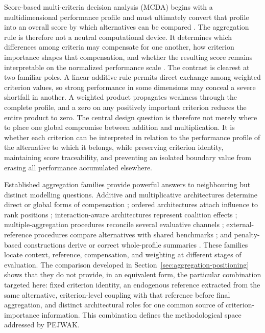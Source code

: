 \documentclass[reqno,11pt]{amsart}
\theoremstyle{definition}
\theoremstyle{plain}
\theoremstyle{remark}
\begin{document}
Score-based multi-criteria decision analysis (MCDA) begins with a
multidimensional performance profile and must ultimately convert that
profile into an overall score by which alternatives can be compared
\cite{Greco2025,Keeney1976}. The aggregation rule is therefore not a
neutral computational device. It determines which differences among
criteria may compensate for one another, how criterion importance shapes
that compensation, and whether the resulting score remains interpretable
on the normalized performance scale
\cite{Bouyssou1986,Beliakov2007}. The contrast is clearest at two familiar
poles. A linear additive rule permits direct exchange among weighted
criterion values, so strong performance in some dimensions may conceal a
severe shortfall in another. A weighted product propagates weakness
through the complete profile, and a zero on any positively important
criterion reduces the entire product to zero. The central design question
is therefore not merely where to place one global compromise between
addition and multiplication. It is whether each criterion can be
interpreted in relation to the performance profile of the alternative to
which it belongs, while preserving criterion identity, maintaining score
traceability, and preventing an isolated boundary value from erasing all
performance accumulated elsewhere.

Established aggregation families provide powerful answers to neighbouring
but distinct modelling questions. Additive and multiplicative
architectures determine direct or global forms of compensation
\cite{Beliakov2007,Grabisch2009}; ordered architectures attach influence
to rank positions \cite{Yager1988}; interaction-aware architectures
represent coalition effects \cite{Grabisch1996}; multiple-aggregation
procedures reconcile several evaluative channels
\cite{Zavadskas2012,Liao2020,Wen2020}; external-reference procedures
compare alternatives with shared benchmarks
\cite{HwangYoon1981,Stevic2020}; and penalty-based constructions derive
or correct whole-profile summaries \cite{Calvo2010,Mariani2024}. These
families locate context, reference, compensation, and weighting at
different stages of evaluation. The comparison developed in
Section~\ref{sec:aggregation-positioning} shows that they do not provide,
in an equivalent form, the particular combination targeted here: fixed
criterion identity, an endogenous reference extracted from the same
alternative, criterion-level coupling with that reference before final
aggregation, and distinct architectural roles for one common source of
criterion-importance information. This combination defines the
methodological space addressed by PEJWAK.
\end{document}
